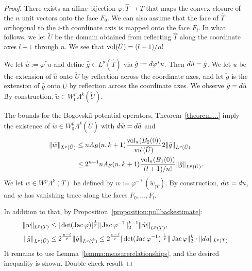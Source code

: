 \documentclass[10pt,a4paper]{article}
\newcommand{\mwl}[1]{{\color{red}#1}}
\begin{document}
\begin{proof}
    There exists an affine bijection $\varphi : \hat T \rightarrow T$ 
	that maps the convex closure of the $n$ unit vectors onto the face $F_0$.
    We can also assume that the face of $\hat T$
    orthogonal to the $i$-th coordinate axis is mapped 
    onto the face $F_i$. 
    In what follows, we let $\tilde U$ be the domain obtained from reflecting $\hat T$ along the coordinate axes $l+1$ through $n$. 
    We see that $\operatorname{vol}(\tilde U) = (l+1)/n!$
    
    We let $\hat u := \varphi^{\ast} u$ and define $\hat g \in L^{p}(\hat T)$ via $\hat g := d \varphi^{\ast} u$. 
    Then $d \hat u = \hat g$. 
    We let $\tilde u$ be the extension of $\hat u$ onto $\tilde U$ by reflection across the coordinate axes,
    and let $\tilde g$ is the extension of $\hat g$ onto $\tilde U$ by reflection across the coordinate axes. 
    We observe $\tilde g = d \tilde u$
    By construction, $\tilde u \in W^{p}_{0}\Lambda^{k}(\tilde U)$.
    
    The bounds for the Bogovski\u{i} potential operators, Theorem~\ref{theorem:...} imply 
    the existence of $\tilde w \in W^{p}_{0}\Lambda^{k}(\tilde U)$
    with $d \tilde w = d \tilde u$ and 
    \begin{align*}
        \| \tilde w \|_{L^{p}(\tilde U)}
        &\leq 
        n A_{{\mathcal B}}(n,k+1) \frac{ \operatorname{vol}_{n}(B_2(0)) }{ \operatorname{vol}(\tilde U) } 
        2
        \| \tilde g \|_{L^{p}(\tilde U)}
        \\&\leq 
        2^{n+1} n A_{{\mathcal B}}(n,k+1) \frac{ \operatorname{vol}_{n}(B_1(0)) }{ (l+1)/n! } 
        \| \tilde g \|_{L^{p}(\tilde U)}
        .
    \end{align*}
    We let $w \in W^{p}\Lambda^{k}(T)$ be defined by $w := \varphi^{-\ast} ( \tilde w_{|\hat T} )$.
    By construction, $d w = d u$,
    and $w$ has vanishing trace along the faces $F_{0},\dots,F_{l}$.
    
    In addition to that, by Proposition~\ref{proposition:pullbackestimate}:
    \begin{align*}
        \| w \|_{L^{p}(T)}
        &\leq 
        |\det(\operatorname{{\rm Jac}} \varphi)|^{\frac 1 p} 
        \|  \operatorname{{\rm Jac}} \varphi^{-1}  \|_{2}^{k-1}
        \| \tilde w \|_{L^{p}(\hat T)}
        ,
        \\
        \| \tilde g \|_{L^{p}(\tilde U)}
        &\leq 
        2^{\frac {n-\ell} p}
        \| \hat g \|_{L^{p}(\hat T)}
        \leq 
        2^{\frac {n-\ell} p}
        |\det( \operatorname{{\rm Jac}} \varphi^{-1} )|^{\frac 1 p} 
        \| \operatorname{{\rm Jac}} \varphi \|_{2}^{k}
        \cdot 
        \| d u \|_{L^{p}(T)}
        .
    \end{align*}
    It remains to use Lemma~\ref{lemma:measurerelationships}, and the desired inequality is shown. \mwl{Double check result}
\end{proof}
\end{document}
